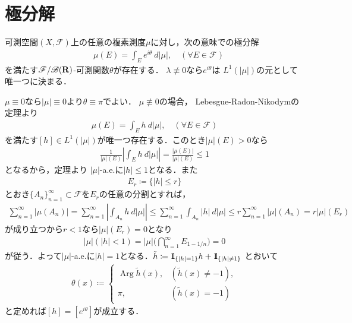 \section{極分解}
	\begin{screen}
		\begin{thm}[複素測度の極分解]\label{thm:polar_decomposition_of_complex_measures}
			可測空間$(X,\mathscr{F})$上の任意の複素測度$\mu$に対し，次の意味での極分解
			\begin{align}
				\quad \mu(E) = \int_E e^{i\theta}\ d|\mu|,
				\quad (\forall E \in \mathscr{F})
			\end{align}
			を満たす$\mathscr{F}/\mathscr{B}(\mathbf{R})$-可測関数$\theta$が存在する．
			$\lambda \not\equiv 0$なら$e^{i \theta}$は
			$L^1(|\mu|)$の元として唯一つに決まる．
		\end{thm}
	\end{screen}
	
	\begin{prf} $\mu \equiv 0$なら$|\mu| \equiv 0$より$\theta \equiv \pi$でよい．
		$\mu \not\equiv 0$の場合，
		Lebesgue-Radon-Nikodymの定理より
		\begin{align}
			\mu(E) = \int_E h\ d|\mu|,
			\quad (\forall E \in \mathscr{F})
		\end{align}
		を満たす$[h] \in L^1(|\mu|)$が唯一つ存在する．このとき$|\mu|(E) > 0$なら
		\begin{align}
			\frac{1}{|\mu|(E)} \left| \int_E h\ d|\mu| \right|
			= \frac{|\mu(E)|}{|\mu|(E)} \leq 1
		\end{align}
		となるから，定理より
		$|\mu|$-a.e.に$|h| \leq 1$となる．また
		\begin{align}
			E_r \coloneqq \{|h| \leq r\}
		\end{align}
		とおき$\{A_n\}_{n=1}^\infty \subset \mathscr{F}$を$E_r$の任意の分割とすれば，
		\begin{align}
			\sum_{n=1}^\infty |\mu(A_n)|
			= \sum_{n=1}^\infty \left|\int_{A_n} h\ d|\mu|\right|
			\leq \sum_{n=1}^\infty \int_{A_n} |h|\ d|\mu|
			\leq r \sum_{n=1}^\infty |\mu|(A_n)
			= r |\mu|(E_r)
		\end{align}
		が成り立つから$r < 1$なら$|\mu|(E_r) = 0$となり
		\begin{align}
			|\mu|\left(|h|< 1 \right)
			= |\mu| \Biggl(\bigcap_{n=1}^\infty E_{1-1/n} \Biggr)
			= 0
		\end{align}
		が従う．よって$|\mu|$-a.e.に$|h|=1$となる．$\tilde{h} \coloneqq \mbox{1}\hspace{-0.25em}\mbox{l}_{\{|h|=1\}}h + \mbox{1}\hspace{-0.25em}\mbox{l}_{\{|h|\neq1\}}$
		とおいて
		\begin{align}
			\theta(x) \coloneqq
			\begin{cases}
				\operatorname{Arg} \tilde{h}(x), & (\tilde{h}(x) \neq -1), \\
				\pi, & (\tilde{h}(x) = -1)
			\end{cases}
		\end{align}
		と定めれば$[h] = [e^{i \theta}]$が成立する．
		\QED
	\end{prf}
	
